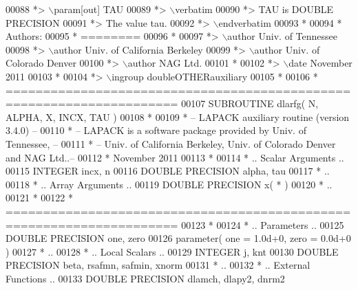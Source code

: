 \begin{DoxyCode}
00088 \textcolor{comment}{*> \(\backslash\)param[out] TAU}
00089 \textcolor{comment}{*> \(\backslash\)verbatim}
00090 \textcolor{comment}{*>          TAU is DOUBLE PRECISION}
00091 \textcolor{comment}{*>          The value tau.}
00092 \textcolor{comment}{*> \(\backslash\)endverbatim}
00093 \textcolor{comment}{*}
00094 \textcolor{comment}{*  Authors:}
00095 \textcolor{comment}{*  ========}
00096 \textcolor{comment}{*}
00097 \textcolor{comment}{*> \(\backslash\)author Univ. of Tennessee }
00098 \textcolor{comment}{*> \(\backslash\)author Univ. of California Berkeley }
00099 \textcolor{comment}{*> \(\backslash\)author Univ. of Colorado Denver }
00100 \textcolor{comment}{*> \(\backslash\)author NAG Ltd. }
00101 \textcolor{comment}{*}
00102 \textcolor{comment}{*> \(\backslash\)date November 2011}
00103 \textcolor{comment}{*}
00104 \textcolor{comment}{*> \(\backslash\)ingroup doubleOTHERauxiliary}
00105 \textcolor{comment}{*}
00106 \textcolor{comment}{*  =====================================================================}
00107 \textcolor{keyword}{      SUBROUTINE }dlarfg( N, ALPHA, X, INCX, TAU )
00108 \textcolor{comment}{*}
00109 \textcolor{comment}{*  -- LAPACK auxiliary routine (version 3.4.0) --}
00110 \textcolor{comment}{*  -- LAPACK is a software package provided by Univ. of Tennessee,    --}
00111 \textcolor{comment}{*  -- Univ. of California Berkeley, Univ. of Colorado Denver and NAG Ltd..--}
00112 \textcolor{comment}{*     November 2011}
00113 \textcolor{comment}{*}
00114 \textcolor{comment}{*     .. Scalar Arguments ..}
00115       \textcolor{keywordtype}{INTEGER}            incx, n
00116       \textcolor{keywordtype}{DOUBLE PRECISION}   alpha, tau
00117 \textcolor{comment}{*     ..}
00118 \textcolor{comment}{*     .. Array Arguments ..}
00119       \textcolor{keywordtype}{DOUBLE PRECISION}   x( * )
00120 \textcolor{comment}{*     ..}
00121 \textcolor{comment}{*}
00122 \textcolor{comment}{*  =====================================================================}
00123 \textcolor{comment}{*}
00124 \textcolor{comment}{*     .. Parameters ..}
00125       \textcolor{keywordtype}{DOUBLE PRECISION}   one, zero
00126       parameter( one = 1.0d+0, zero = 0.0d+0 )
00127 \textcolor{comment}{*     ..}
00128 \textcolor{comment}{*     .. Local Scalars ..}
00129       \textcolor{keywordtype}{INTEGER}            j, knt
00130       \textcolor{keywordtype}{DOUBLE PRECISION}   beta, rsafmn, safmin, xnorm
00131 \textcolor{comment}{*     ..}
00132 \textcolor{comment}{*     .. External Functions ..}
00133       \textcolor{keywordtype}{DOUBLE PRECISION}   dlamch, dlapy2, dnrm2

\end{DoxyCode}
